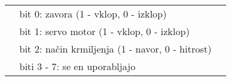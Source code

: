 \begin{tabular}{l l l}
	& bit 0: zavora (1 - vklop, 0 - izklop) \\
	& bit 1: servo motor (1 - vklop, 0 - izklop)\\
	& bit 2: na\v{c}in krmiljenja (1 - navor, 0 - hitrost) \\
	& biti 3 - 7: se en uporabljajo\\
\end{tabular}